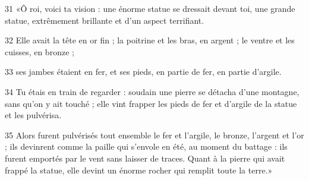 31 «Ô roi, voici ta vision : une énorme statue se dressait devant toi, une grande statue, extrêmement brillante et d’un aspect terrifiant.

32 Elle avait la tête en or fin ; la poitrine et les bras, en argent ; le ventre et les cuisses, en bronze ;

33 ses jambes étaient en fer, et ses pieds, en partie de fer, en partie d’argile.

34 Tu étais en train de regarder : soudain une pierre se détacha d’une montagne, sans qu’on y ait touché ; elle vint frapper les pieds de fer et d’argile de la statue et les pulvérisa.

35 Alors furent pulvérisés tout ensemble le fer et l’argile, le bronze, l’argent et l’or ; ils devinrent comme la paille qui s’envole en été, au moment du battage : ils furent emportés par le vent sans laisser de traces. Quant à la pierre qui avait frappé la statue, elle devint un énorme rocher qui remplit toute la terre.»
